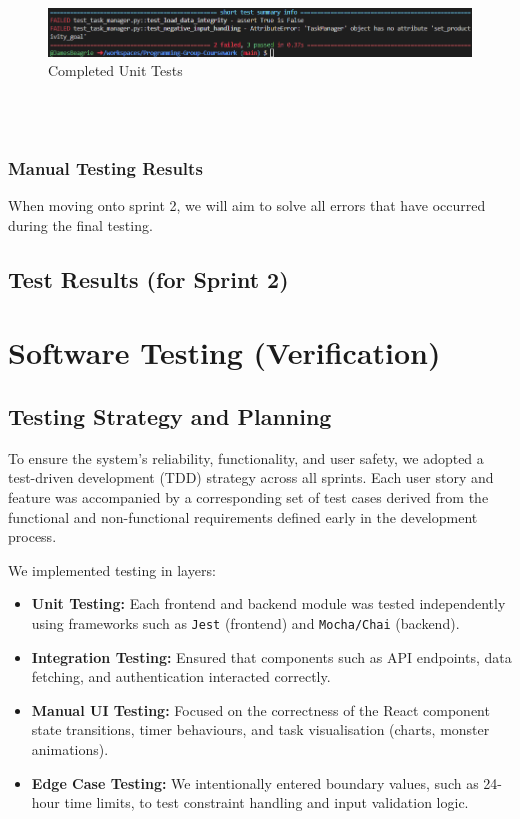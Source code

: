 \documentclass[12pt,a4paper]{article}
\begin{document}
\begin{figure}[H]
    \centering
    \includegraphics[width=1\linewidth]{image.png}
    \caption{Completed Unit Tests}
    \label{fig:unit-tests-sprint-1}
\end{figure}

\\
\\

\subsubsection{Manual Testing Results}

When moving onto sprint 2, we will aim to solve all errors that have occurred during the final testing.

\subsection{Test Results (for Sprint 2)}

\newpage






\section{Software Testing (Verification)}

\subsection{Testing Strategy and Planning}

To ensure the system's reliability, functionality, and user safety, we adopted a test-driven development (TDD) strategy across all sprints. Each user story and feature was accompanied by a corresponding set of test cases derived from the functional and non-functional requirements defined early in the development process.

We implemented testing in layers:
\begin{itemize}
    \item \textbf{Unit Testing:} Each frontend and backend module was tested independently using frameworks such as \texttt{Jest} (frontend) and \texttt{Mocha/Chai} (backend).
    \item \textbf{Integration Testing:} Ensured that components such as API endpoints, data fetching, and authentication interacted correctly.
    \item \textbf{Manual UI Testing:} Focused on the correctness of the React component state transitions, timer behaviours, and task visualisation (charts, monster animations).
    \item \textbf{Edge Case Testing:} We intentionally entered boundary values, such as 24-hour time limits, to test constraint handling and input validation logic.
\end{itemize}
\end{document}
